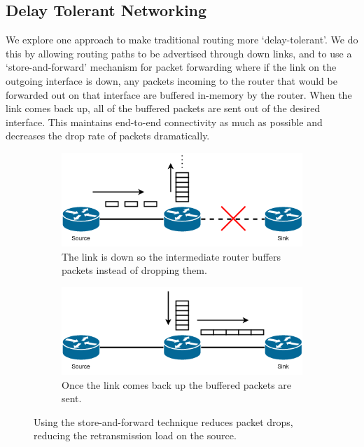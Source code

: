 \documentclass[10pt,twoside,a4paper]{article}
\begin{document}
\subsection{Delay Tolerant Networking}
We explore one approach to make traditional routing more `delay-tolerant'. We do this by allowing routing paths to be advertised through down links, and to use a `store-and-forward' mechanism for packet forwarding where if the link on the outgoing interface is down, any packets incoming to the router that would be forwarded out on that interface are buffered in-memory by the router. When the link comes back up, all of the buffered packets are sent out of the desired interface. This maintains end-to-end connectivity as much as possible and decreases the drop rate of packets dramatically.

\begin{figure}[H]
\centering
\begin{subfigure}{.6\textwidth}
  \centering
  \includegraphics[width=1\linewidth]{storeandforward_down}
  \caption{The link is down so the intermediate router buffers packets instead of dropping them.}
  \label{fig:saf_down}
\end{subfigure}
\begin{subfigure}{.6\textwidth}
  \centering
  \includegraphics[width=1\linewidth]{storeandforward_up}
  \caption{Once the link comes back up the buffered packets are sent.}
  \label{fig:saf_up}
\end{subfigure}
\caption{Using the store-and-forward technique reduces packet drops, reducing the retransmission load on the source.}
\label{fig:saf}
\end{figure}
\end{document}
